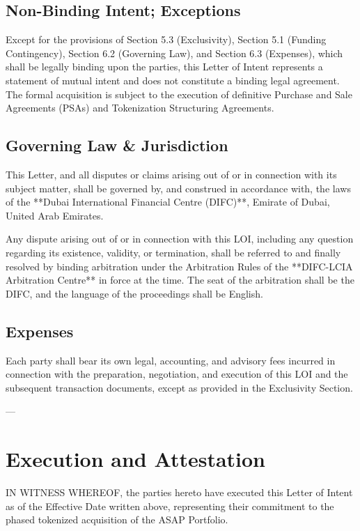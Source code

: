 \documentclass[11pt,a4paper]{article}
\begin{document}
\subsection{Non-Binding Intent; Exceptions}
Except for the provisions of Section 5.3 (Exclusivity), Section 5.1 (Funding Contingency), Section 6.2 (Governing Law), and Section 6.3 (Expenses), which shall be legally binding upon the parties, this Letter of Intent represents a statement of mutual intent and does not constitute a binding legal agreement. The formal acquisition is subject to the execution of definitive Purchase and Sale Agreements (PSAs) and Tokenization Structuring Agreements.

\subsection{Governing Law \& Jurisdiction}
This Letter, and all disputes or claims arising out of or in connection with its subject matter, shall be governed by, and construed in accordance with, the laws of the **Dubai International Financial Centre (DIFC)**, Emirate of Dubai, United Arab Emirates.
\par\vspace{5pt}
Any dispute arising out of or in connection with this LOI, including any question regarding its existence, validity, or termination, shall be referred to and finally resolved by binding arbitration under the Arbitration Rules of the **DIFC-LCIA Arbitration Centre** in force at the time. The seat of the arbitration shall be the DIFC, and the language of the proceedings shall be English.

\subsection{Expenses}
Each party shall bear its own legal, accounting, and advisory fees incurred in connection with the preparation, negotiation, and execution of this LOI and the subsequent transaction documents, except as provided in the Exclusivity Section.

---

\section{Execution and Attestation}
IN WITNESS WHEREOF, the parties hereto have executed this Letter of Intent as of the Effective Date written above, representing their commitment to the phased tokenized acquisition of the ASAP Portfolio.
\end{document}
